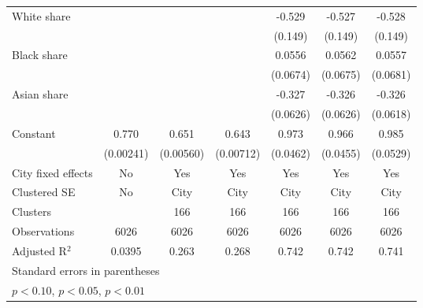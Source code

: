 {\begin{tabular}{l*{6}{c}}
\addlinespace
White share         &                     &                     &                     &      -0.529\sym{***}&      -0.527\sym{***}&      -0.528\sym{***}\\
                    &                     &                     &                     &     (0.149)         &     (0.149)         &     (0.149)         \\
\addlinespace
Black share         &                     &                     &                     &      0.0556         &      0.0562         &      0.0557         \\
                    &                     &                     &                     &    (0.0674)         &    (0.0675)         &    (0.0681)         \\
\addlinespace
Asian share         &                     &                     &                     &      -0.327\sym{***}&      -0.326\sym{***}&      -0.326\sym{***}\\
                    &                     &                     &                     &    (0.0626)         &    (0.0626)         &    (0.0618)         \\
\addlinespace
Constant            &       0.770\sym{***}&       0.651\sym{***}&       0.643\sym{***}&       0.973\sym{***}&       0.966\sym{***}&       0.985\sym{***}\\
                    &   (0.00241)         &   (0.00560)         &   (0.00712)         &    (0.0462)         &    (0.0455)         &    (0.0529)         \\
\midrule
City fixed effects  &          No         &         Yes         &         Yes         &         Yes         &         Yes         &         Yes         \\
Clustered SE        &          No         &        City         &        City         &        City         &        City         &        City         \\
Clusters            &                     &         166         &         166         &         166         &         166         &         166         \\
Observations        &        6026         &        6026         &        6026         &        6026         &        6026         &        6026         \\
Adjusted R$^2$      &      0.0395         &       0.263         &       0.268         &       0.742         &       0.742         &       0.741         \\
\bottomrule
\multicolumn{7}{l}{\footnotesize Standard errors in parentheses}\\
\multicolumn{7}{l}{\footnotesize \sym{*} \(p<0.10\), \sym{**} \(p<0.05\), \sym{***} \(p<0.01\)}\\
\end{tabular}
}
